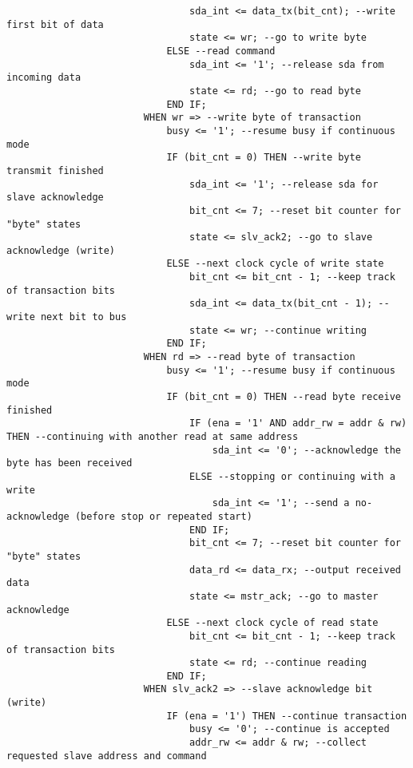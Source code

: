 \begin{lstlisting}
                                sda_int <= data_tx(bit_cnt); --write first bit of data
                                state <= wr; --go to write byte
                            ELSE --read command
                                sda_int <= '1'; --release sda from incoming data
                                state <= rd; --go to read byte
                            END IF;
                        WHEN wr => --write byte of transaction
                            busy <= '1'; --resume busy if continuous mode
                            IF (bit_cnt = 0) THEN --write byte transmit finished
                                sda_int <= '1'; --release sda for slave acknowledge
                                bit_cnt <= 7; --reset bit counter for "byte" states
                                state <= slv_ack2; --go to slave acknowledge (write)
                            ELSE --next clock cycle of write state
                                bit_cnt <= bit_cnt - 1; --keep track of transaction bits
                                sda_int <= data_tx(bit_cnt - 1); --write next bit to bus
                                state <= wr; --continue writing
                            END IF;
                        WHEN rd => --read byte of transaction
                            busy <= '1'; --resume busy if continuous mode
                            IF (bit_cnt = 0) THEN --read byte receive finished
                                IF (ena = '1' AND addr_rw = addr & rw) THEN --continuing with another read at same address
                                    sda_int <= '0'; --acknowledge the byte has been received
                                ELSE --stopping or continuing with a write
                                    sda_int <= '1'; --send a no-acknowledge (before stop or repeated start)
                                END IF;
                                bit_cnt <= 7; --reset bit counter for "byte" states
                                data_rd <= data_rx; --output received data
                                state <= mstr_ack; --go to master acknowledge
                            ELSE --next clock cycle of read state
                                bit_cnt <= bit_cnt - 1; --keep track of transaction bits
                                state <= rd; --continue reading
                            END IF;
                        WHEN slv_ack2 => --slave acknowledge bit (write)
                            IF (ena = '1') THEN --continue transaction
                                busy <= '0'; --continue is accepted
                                addr_rw <= addr & rw; --collect requested slave address and command

\end{lstlisting}
